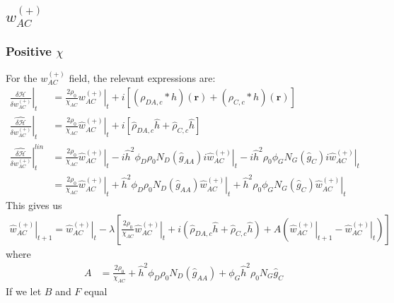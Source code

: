 \documentclass{article}
\begin{document}
  \subsection{$w_{AC}^{(+)}$}
    \subsubsection{Positive $\chi$}
  For the $w_{AC}^{(+)}$ field, the relevant expressions are:
  \begin{align*}
    \left. \frac{\delta \mathcal{H}}{\delta  w_{AC}^{(+)} } \right|_t &=
      \frac{2\rho_0}{\chi_{AC}} \left. w_{AC}^{(+)} \right|_t
      + i [ (\rho_{DA,c} \ast h)(\mathbf{r})
            + (\rho_{C,c} \ast h)(\mathbf{r}) ] \\
      \left. \hat{\frac{\delta \mathcal{H}}{\delta w_{AC}^{(+)}}} \right|_t &=
      \frac{2\rho_0}{\chi_{AC}} \left. \hat{w}_{AC}^{(+)} \right|_t
      + i [ \hat{\rho}_{DA,c} \hat{h}
            + \hat{\rho}_{C,c} \hat{h} ] \\
    \left. \hat{\frac{\delta \mathcal{H}}{\delta w_{AC}^{(+)}}} \right| ^{lin}_t &=
      \frac{2\rho_0}{\chi_{AC}} \left. \hat{w}_{AC}^{(+)} \right|_t
      - i \hat{h}^2 \phi_D \rho_0 N_D
        (\hat{g}_{AA}  ) i \left.
          \hat{w}_{AC}^{(+)} \right|_t - i \hat{h} ^2  {\rho}_0  
          \left. \phi_G N_G (\hat{g}_{C}) i \hat{w}_{AC}^{(+)} \right|_t
          \\
    &= \frac{2\rho_0}{\chi_{AC}} \left. \hat{w}_{AC}^{(+)} \right|_t
      + \hat{h}^2 \phi_D \rho_0 N_D
        (\hat{g}_{AA} )
          \left. \hat{w}_{AC}^{(+)} \right|_t + 
          \hat{h} ^2  {\rho}_0  \left. \phi_G N_G (\hat{g}_{C})  \hat{w}_{AC}^{(+)} \right|_t
  \end{align*}
  This gives us
  \begin{align*}
    \left. \hat{w}_{AC}^{(+)} \right|_{t+1} =
      \left. \hat{w}_{AC}^{(+)} \right|_t - \lambda \left[
        \frac{2\rho_0}{\chi_{AC}} \left. \hat{w}_{AC}^{(+)} \right|_t
        + i ( \hat{\rho}_{DA,c} \hat{h}
              + \hat{\rho}_{C,c} \hat{h} )
        + A ( \left. \hat{w}_{AC}^{(+)} \right|_{t+1}
              - \left. \hat{w}_{AC}^{(+)} \right|_t)
      \right]
  \end{align*}
  where
  \begin{align*}
    A &=
    \frac{2\rho_0}{\chi_{AC}}
        + \hat{h}^2 \phi_D \rho_0 N_D
          (\hat{g}_{AA} ) + \phi_G   \hat{h}^2  \rho_0 N_G 
          \hat{g}_{C}
  \end{align*}
  If we let $B$ and $F$ equal
\end{document}
